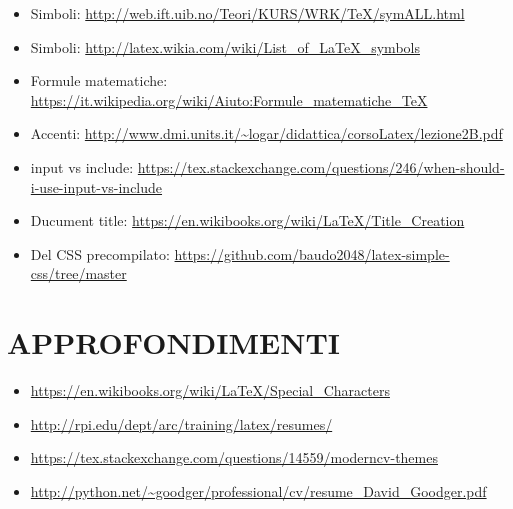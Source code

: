 \documentclass[a4paper,10pt]{article}
\begin{document}
\begin{itemize}
 \item Simboli: \url{http://web.ift.uib.no/Teori/KURS/WRK/TeX/symALL.html}
 \item Simboli: \url{http://latex.wikia.com/wiki/List_of_LaTeX_symbols}
 \item Formule matematiche: \url{https://it.wikipedia.org/wiki/Aiuto:Formule_matematiche_TeX}
 \item Accenti: \url{http://www.dmi.units.it/~logar/didattica/corsoLatex/lezione2B.pdf}
 \item input vs include: \url{https://tex.stackexchange.com/questions/246/when-should-i-use-input-vs-include}
 \item Ducument title: \url{https://en.wikibooks.org/wiki/LaTeX/Title_Creation}
 \item Del CSS precompilato: \url{https://github.com/baudo2048/latex-simple-css/tree/master}
\end{itemize}


\section{APPROFONDIMENTI}
\begin{itemize}
 \item \url{https://en.wikibooks.org/wiki/LaTeX/Special_Characters}
 \item \url{http://rpi.edu/dept/arc/training/latex/resumes/}
 \item \url{https://tex.stackexchange.com/questions/14559/moderncv-themes}
 \item \url{http://python.net/~goodger/professional/cv/resume_David_Goodger.pdf}
\end{itemize}
\end{document}
